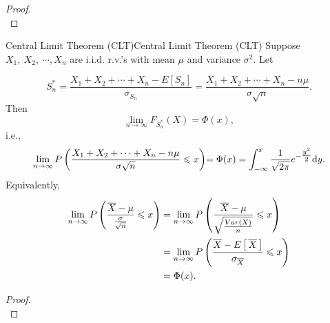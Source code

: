 \documentclass{elegantbook}
\begin{document}
\begin{proof}
\\[4cm]\vspace{0.01cm}
\end{proof}

\begin{theorem}{Central Limit Theorem (CLT)}{Central Limit Theorem (CLT)}
Suppose \(X_{1},\ X_{2},\ \cdots,X_{n}\) are i.i.d. r.v.'s with mean \(\mu\) and variance \(\sigma^{2}\). Let

\[S_{n}^{*} = \frac{X_{1} + X_{2} + \cdots + X_{n} - E[S_{n}]}{\sigma_{S_{n}}} = \frac{X_{1} + X_{2} + \cdots + X_{n} - n\mu}{\sigma\sqrt{n}}.\]
Then
\[\lim_{n \rightarrow \infty}{F_{S_{n}^{*}}(X) = \Phi(x)},\]
i.e.,
\[{\lim_{n \rightarrow \infty}P\left( \frac{X_{1} + X_{2} + \cdots + X_{n} - n\mu}{\sigma\sqrt{n}} \ls x \right)}{= \Phi(x)} = \int_{- \infty}^{x}\frac{1}{\sqrt{2\pi}}e^{- \tfrac{y^{2}}{2}}\dif y.\]
Equivalently,
\[\begin{aligned}
{\lim_{n \rightarrow \infty}P\left( \frac{\overline{X} - \mu}{\frac{\sigma}{\sqrt{n}}} \leqslant x \right)}&= \lim_{n \rightarrow \infty}P\left( \frac{\overline{X} - \mu}{\sqrt{\frac{Var(X)}{n}}} \leqslant x \right)\\
& = \lim_{n \rightarrow \infty}P\left( \frac{\overline{X} - E\left\lbrack\, \overline{X}\, \right\rbrack}{\sigma_{\overline{X}}} \leqslant x \right) \\
&= \Phi(x).\\
\end{aligned}\]
\end{theorem}

\begin{proof}
\\[4cm]\vspace{0.01cm}
\end{proof}


%
%
%
%
%
%
%
%
%
%
%
%
%
\end{document}
